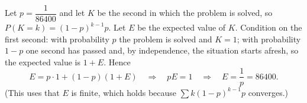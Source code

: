 Let $p=\dfrac1{86400}$ and let $K$ be the second in which the problem is solved, so $P(K=k)=(1-p)^{k-1}p$. Let $E$ be the expected value of $K$. Condition on the first second: with probability $p$ the problem is solved and $K=1$; with probability $1-p$ one second has passed and, by independence, the situation starts afresh, so the expected value is $1+E$. Hence
\[E=p\cdot1+(1-p)(1+E)\quad\Longrightarrow\quad pE=1\quad\Longrightarrow\quad E=\dfrac1p=\boxed{86400}.\]
(This uses that $E$ is finite, which holds because $\sum k(1-p)^{k-1}p$ converges.)
